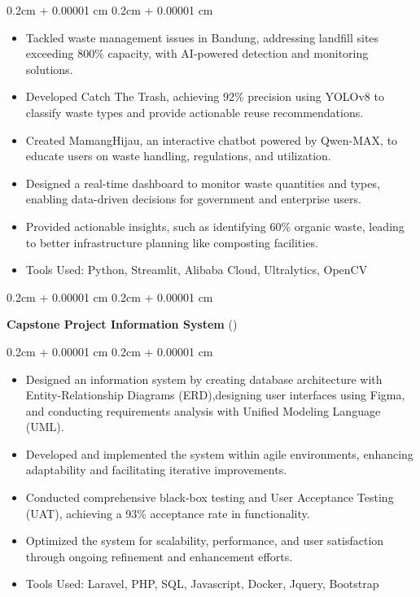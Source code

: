 \documentclass[10pt, a4paper]{article}
\newenvironment{highlights}{
    \begin{itemize}[
        topsep=0cm,
        parsep=0cm,
        partopsep=0pt,
        itemsep=0pt,
        leftmargin=0cm + 10pt
    ]
}{
    \end{itemize}
} %
\newenvironment{onecolentry}{
    \begin{adjustwidth}{
        0.2cm + 0.00001 cm
    }{
        0.2cm + 0.00001 cm
    }
}{
    \end{adjustwidth}
} %
\newenvironment{twocolentry}[2][]{
    \onecolentry
    \def\secondColumn{#2}
    \setcolumnwidth{\fill, 4.5cm}
    \begin{paracol}{2}
}{
    \switchcolumn \raggedleft \secondColumn
    \end{paracol}
    \endonecolentry
} %
\let\hrefWithoutArrow\href
\renewcommand{\href}[2]{\hrefWithoutArrow{#1}{\ifthenelse{\equal{#2}{}}{ }{#2 }\raisebox{.15ex}{\footnotesize \faExternalLink*}}}
\begin{document}
        \vspace{0cm}
        \begin{onecolentry}
            \begin{highlights}
                \item Tackled waste management issues in Bandung, addressing landfill sites exceeding 800\% capacity, with AI-powered detection and monitoring solutions.
                \item Developed Catch The Trash, achieving 92\% precision using YOLOv8 to classify waste types and provide actionable reuse recommendations.
                \item Created MamangHijau, an interactive chatbot powered by Qwen-MAX, to educate users on waste handling, regulations, and utilization.
                \item Designed a real-time dashboard to monitor waste quantities and types, enabling data-driven decisions for government and enterprise users.
                \item Provided actionable insights, such as identifying 60\% organic waste, leading to better infrastructure planning like composting facilities.
                \item Tools Used: Python, Streamlit, Alibaba Cloud, Ultralytics, OpenCV
            \end{highlights}
        \end{onecolentry}


        \vspace{0.1cm}

        \begin{twocolentry}{
            (\href{https://drive.google.com/file/d/1x37qvoekHEoIhrANusdd5onVDC--48Cn/view?usp=sharing}{Project Report})
        }
            \textbf{Capstone Project Information System}\end{twocolentry}

        \vspace{0cm}
        \begin{onecolentry}
            \begin{highlights}
                \item Designed an information system by creating database architecture with Entity-Relationship Diagrams (ERD),designing user interfaces using Figma, and conducting requirements analysis with Unified Modeling Language (UML).
                \item Developed and implemented the system within agile environments, enhancing adaptability and facilitating iterative improvements.
                \item Conducted comprehensive black-box testing and User Acceptance Testing (UAT), achieving a 93\% acceptance rate in functionality.
                \item Optimized the system for scalability, performance, and user satisfaction through ongoing refinement and enhancement efforts.
                \item Tools Used: Laravel, PHP, SQL, Javascript, Docker, Jquery, Bootstrap
            \end{highlights}
        \end{onecolentry}
\end{document}
